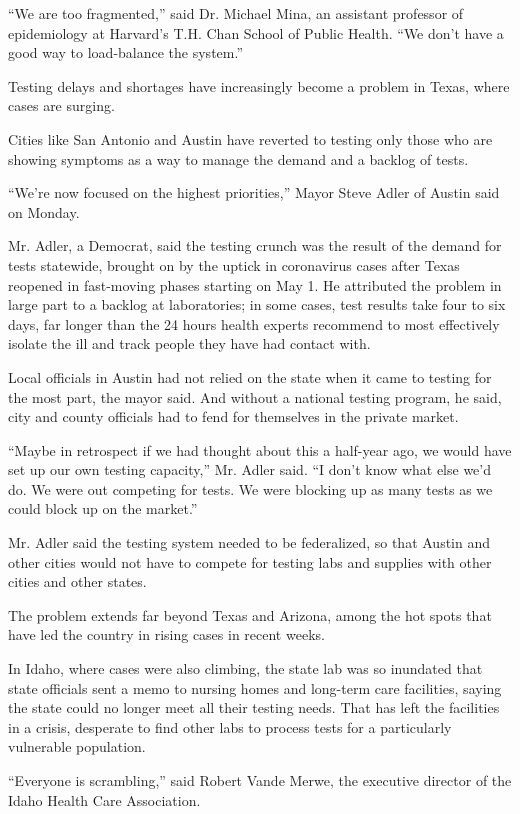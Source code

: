 ``We are too fragmented,'' said Dr. Michael Mina, an assistant professor
of epidemiology at Harvard's T.H. Chan School of Public Health. ``We
don't have a good way to load-balance the system.''

Testing delays and shortages have increasingly become a problem in
Texas, where cases are surging.

Cities like San Antonio and Austin have reverted to testing only those
who are showing symptoms as a way to manage the demand and a backlog of
tests.

``We're now focused on the highest priorities,'' Mayor Steve Adler of
Austin said on Monday.

Mr. Adler, a Democrat, said the testing crunch was the result of the
demand for tests statewide, brought on by the uptick in coronavirus
cases after Texas reopened in fast-moving phases starting on May 1. He
attributed the problem in large part to a backlog at laboratories; in
some cases, test results take four to six days, far longer than the 24
hours health experts recommend to most effectively isolate the ill and
track people they have had contact with.

Local officials in Austin had not relied on the state when it came to
testing for the most part, the mayor said. And without a national
testing program, he said, city and county officials had to fend for
themselves in the private market.

``Maybe in retrospect if we had thought about this a half-year ago, we
would have set up our own testing capacity,'' Mr. Adler said. ``I don't
know what else we'd do. We were out competing for tests. We were
blocking up as many tests as we could block up on the market.''

Mr. Adler said the testing system needed to be federalized, so that
Austin and other cities would not have to compete for testing labs and
supplies with other cities and other states.

The problem extends far beyond Texas and Arizona, among the hot spots
that have led the country in rising cases in recent weeks.

In Idaho, where cases were also climbing, the state lab was so inundated
that state officials sent a memo to nursing homes and long-term care
facilities, saying the state could no longer meet all their testing
needs. That has left the facilities in a crisis, desperate to find other
labs to process tests for a particularly vulnerable population.

``Everyone is scrambling,'' said Robert Vande Merwe, the executive
director of the Idaho Health Care Association.


